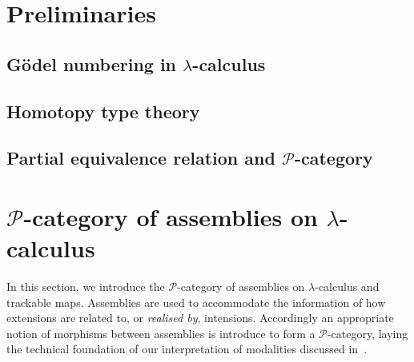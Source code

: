 \documentclass[a4paper,UKenglish,numberwithinsect,cleveref,thm-restate]{lipics-v2021}
\newcommand{\PP}{\mathscr{P}}
\theoremstyle{plain}
\begin{document}
\section{Preliminaries}\label{sec:preliminaries}

\subsection{Gödel numbering in \texorpdfstring{$\lambda$}{λ}-calculus}
\subsection{Homotopy type theory}
\subsection{Partial equivalence relation and \texorpdfstring{$\PP$}{P}-category}

\section{\texorpdfstring{$\PP$}{P}-category of assemblies on \texorpdfstring{$\lambda$}{λ}-calculus}\label{sec:assemblies}
In this section, we introduce the $\PP$-category of assemblies on $\lambda$-calculus and trackable maps.
Assemblies are used to accommodate the information of how extensions are related to, or \emph{realised by}, intensions. Accordingly an appropriate notion of morphisms between assemblies is introduce to form a $\PP$-category, laying
the technical foundation of our interpretation of modalities discussed in~.
\end{document}
